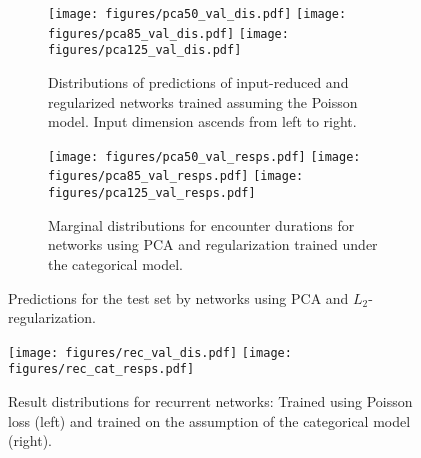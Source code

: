 \documentclass[10pt, twoside, a4paper]{article}
\begin{document}
	\begin{figure}
	\begin{center}
	\begin{subfigure}[b]{17cm}
	\texttt{[image: figures/pca50\_val\_dis.pdf]}
	\texttt{[image: figures/pca85\_val\_dis.pdf]}
	\texttt{[image: figures/pca125\_val\_dis.pdf]}
	\caption{Distributions of predictions of input-reduced and regularized networks trained assuming the Poisson model. Input dimension ascends from left to right.}
	\end{subfigure}
	\begin{subfigure}[b]{17cm}
	\texttt{[image: figures/pca50\_val\_resps.pdf]}
	\texttt{[image: figures/pca85\_val\_resps.pdf]}
	\texttt{[image: figures/pca125\_val\_resps.pdf]}
	\caption{Marginal distributions for encounter durations for networks using PCA and regularization trained under the categorical model.}
	\end{subfigure}
	\end{center}
	\caption{Predictions for the test set by networks using PCA and $L_2$-regularization.}
	\label{fig:evalpca}
	\end{figure}
	\begin{figure}
	\texttt{[image: figures/rec\_val\_dis.pdf]}
	\quad
	\texttt{[image: figures/rec\_cat\_resps.pdf]}
	\caption{Result distributions for recurrent networks: Trained using Poisson loss (left) and trained on the assumption of the categorical model (right). }
	\label{fig:evalrec}
	\end{figure}
\end{document}
